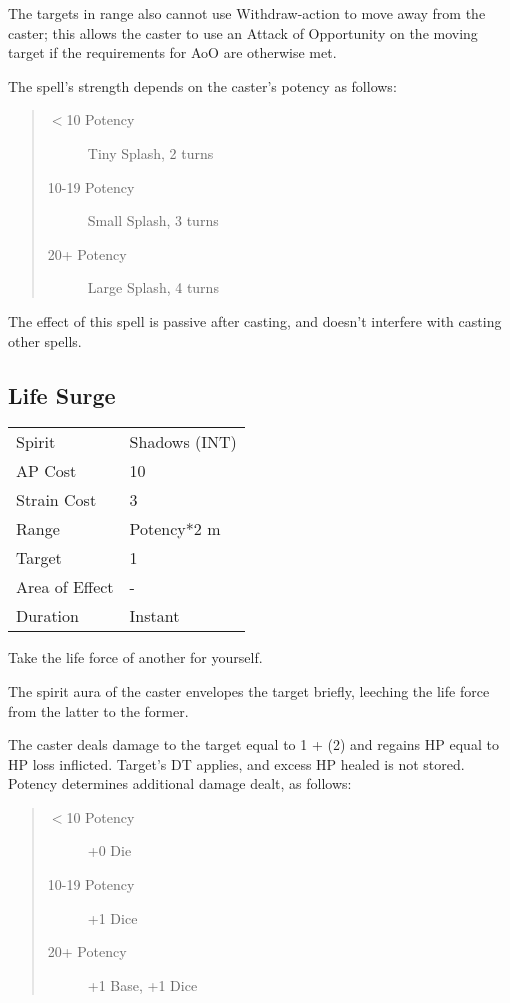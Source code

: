 \documentclass[11pt,a4paper,twocolumn]{book}
\begin{document}
The targets in range also cannot use Withdraw-action to move away from the caster; this allows the caster to use an Attack of Opportunity on the moving target if the requirements for AoO are otherwise met.

The spell's strength depends on the caster's potency as follows: 
\begin{quote}
	\begin{description}
		\item[$<$10 Potency] 	Tiny Splash, 2 turns
		\item[10-19 Potency] 	Small Splash, 3 turns
		\item[20+ Potency]  	Large Splash, 4 turns
	\end{description}	
\end{quote}
\medskip

The effect of this spell is passive after casting, and doesn't interfere with casting other spells.

\subsection*{Life Surge}
{
	\begin{tabu} to 75mm{| X[l,4] | X[l,7] |}
		\hline
		Spirit 			& Shadows (INT) 		\\
		AP Cost	      	& 10 					\\
		Strain Cost     & 3 					\\
		Range     		& Potency*2 m			\\
		Target      	& 1						\\
		Area of Effect  & -  	 				\\
		Duration     	& Instant				\\ \hline
	\end{tabu}
	
}

\medskip

Take the life force of another for yourself.

The spirit aura of the caster envelopes the target briefly, leeching the life force from the latter to the former.

The caster deals damage to the target equal to 1 + (2) and regains HP equal to HP loss inflicted. Target's DT applies, and excess HP healed is not stored. Potency determines additional damage dealt, as follows:

\begin{quote}
	\begin{description}
		\item[$<$10 Potency] 	+0 Die
		\item[10-19 Potency] 	+1 Dice
		\item[20+ Potency] 		+1 Base, +1 Dice
	\end{description}	
\end{quote}
\end{document}
